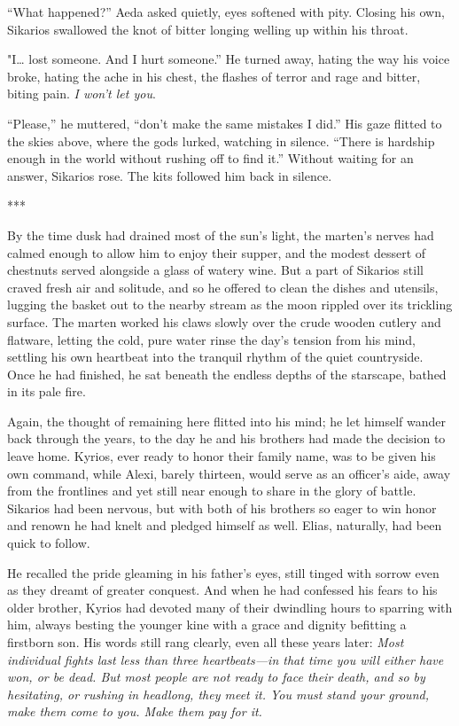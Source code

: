 ``What happened?'' Aeda asked quietly, eyes softened with pity. Closing his own, Sikarios swallowed the knot of bitter longing welling up within his throat.

"I\ldots{} lost someone. And I hurt someone.'' He turned away, hating the way his voice broke, hating the ache in his chest, the flashes of terror and rage and bitter, biting pain. \emph{I won't let you}.

``Please,'' he muttered, ``don't make the same mistakes I did.'' His gaze flitted to the skies above, where the gods lurked, watching in silence. ``There is hardship enough in the world without rushing off to find it.'' Without waiting for an answer, Sikarios rose. The kits followed him back in silence.

***

By the time dusk had drained most of the sun's light, the marten's nerves had calmed enough to allow him to enjoy their supper, and the modest dessert of chestnuts served alongside a glass of watery wine. But a part of Sikarios still craved fresh air and solitude, and so he offered to clean the dishes and utensils, lugging the basket out to the nearby stream as the moon rippled over its trickling surface. The marten worked his claws slowly over the crude wooden cutlery and flatware, letting the cold, pure water rinse the day's tension from his mind, settling his own heartbeat into the tranquil rhythm of the quiet countryside. Once he had finished, he sat beneath the endless depths of the starscape, bathed in its pale fire.

Again, the thought of remaining here flitted into his mind; he let himself wander back through the years, to the day he and his brothers had made the decision to leave home. Kyrios, ever ready to honor their family name, was to be given his own command, while Alexi, barely thirteen, would serve as an officer's aide, away from the frontlines and yet still near enough to share in the glory of battle. Sikarios had been nervous, but with both of his brothers so eager to win honor and renown he had knelt and pledged himself as well. Elias, naturally, had been quick to follow.

He recalled the pride gleaming in his father's eyes, still tinged with sorrow even as they dreamt of greater conquest. And when he had confessed his fears to his older brother, Kyrios had devoted many of their dwindling hours to sparring with him, always besting the younger kine with a grace and dignity befitting a firstborn son. His words still rang clearly, even all these years later: \emph{Most individual fights last less than three heartbeats---in that time you will either have won, or be dead. But most people are not ready to face their death, and so by hesitating, or rushing in headlong, they meet it. You must stand your ground, make them come to you. Make them pay for it.}

